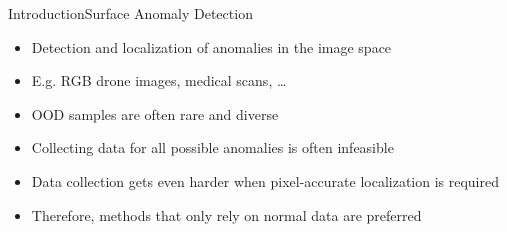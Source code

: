 \begin{frame}{Introduction}{Surface Anomaly Detection}
    \begin{itemize}[<+->]
        \item Detection and localization of anomalies in the image space
    \item E.g. RGB drone images, medical scans, \ldots
    \item OOD samples are often rare and diverse
        \item Collecting data for all possible anomalies is often infeasible
        \item Data collection gets even harder when pixel-accurate localization is required
        \item Therefore, methods that only rely on normal data are preferred
    \end{itemize}
\end{frame}

